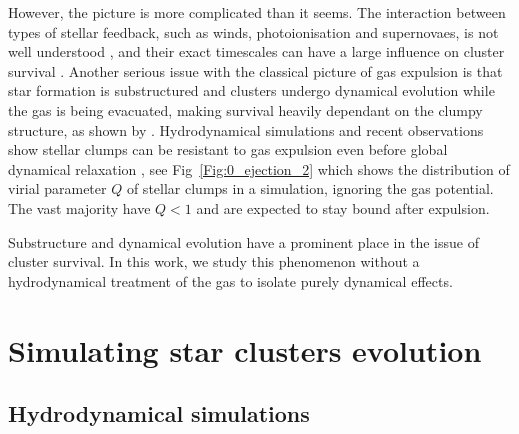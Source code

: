 
However, the picture is more complicated than it seems. The interaction between types of stellar feedback, such as winds, photoionisation and supernovaes, is not well understood \citep{Dale2011,Dale2013}, and their exact timescales can have a large influence on cluster survival \citep{Pelupessy2012}. Another serious issue with the classical picture of gas expulsion is that star formation is substructured and clusters undergo dynamical evolution while the gas is being evacuated, making survival heavily dependant on the clumpy structure, as shown by \cite{Farias2015}. Hydrodynamical simulations and recent observations show stellar clumps can be resistant to gas expulsion even before global dynamical relaxation \citep{Kruijssen2012,Kuhn2015b}, see Fig~\ref{Fig:0_ejection_2} which shows the distribution of virial parameter $Q$ of stellar clumps in a simulation, ignoring the gas potential. The vast majority have $Q<1$ and are expected to stay bound after expulsion.

Substructure and dynamical evolution have a prominent place in the issue of cluster survival. In this work, we study this phenomenon without a hydrodynamical treatment of the gas to isolate purely dynamical effects.



\section{Simulating star clusters evolution}


\subsection{Hydrodynamical simulations}

